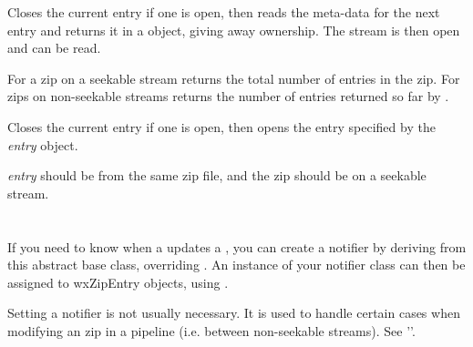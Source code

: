 \label{wxzipinputstreamgetnextentry}


Closes the current entry if one is open, then reads the meta-data for
the next entry and returns it in a 
object, giving away ownership. The stream is then open and can be read.


\label{wxzipinputstreamgettotalentries}


For a zip on a seekable stream returns the total number of entries in
the zip. For zips on non-seekable streams returns the number of entries
returned so far by .


\label{wxzipinputstreamopenentry}


Closes the current entry if one is open, then opens the entry specified
by the {\it entry} object.

{\it entry} should be from the same zip file, and the zip should
be on a seekable stream.




%
%

\section{}\label{wxzipnotifier}

If you need to know when a 
updates a ,
you can create a notifier by deriving from this abstract base class,
overriding .
An instance of your notifier class can then be assigned to wxZipEntry
objects, using .

Setting a notifier is not usually necessary. It is used to handle
certain cases when modifying an zip in a pipeline (i.e. between
non-seekable streams).
See ''.

